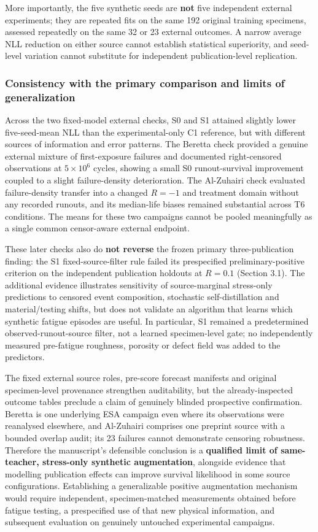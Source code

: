 \documentclass[12pt,a4paper]{article}
\begin{document}
More importantly, the five synthetic seeds are \textbf{not} five independent external experiments; they are repeated fits on the same 192 original training specimens, assessed repeatedly on the same 32 or 23 external outcomes. A narrow average NLL reduction on either source cannot establish statistical superiority, and seed-level variation cannot substitute for independent publication-level replication.

\subsubsection{Consistency with the primary comparison and limits of generalization}

Across the two fixed-model external checks, S0 and S1 attained slightly lower five-seed-mean NLL than the experimental-only C1 reference, but with different sources of information and error patterns. The Beretta check provided a genuine external mixture of first-exposure failures and documented right-censored observations at \(5\times10^6\) cycles, showing a small S0 runout-survival improvement coupled to a slight failure-density deterioration. The Al-Zuhairi check evaluated failure-density transfer into a changed \(R=-1\) and treatment domain without any recorded runouts, and its median-life biases remained substantial across T6 conditions. The means for these two campaigns cannot be pooled meaningfully as a single common censor-aware external endpoint.

These later checks also do \textbf{not reverse} the frozen primary three-publication finding: the S1 fixed-source-filter rule failed its prespecified preliminary-positive criterion on the independent publication holdouts at \(R=0.1\) (Section 3.1). The additional evidence illustrates sensitivity of source-marginal stress-only predictions to censored event composition, stochastic self-distillation and material/testing shifts, but does not validate an algorithm that learns which synthetic fatigue episodes are useful. In particular, S1 remained a predetermined observed-runout-source filter, not a learned specimen-level gate; no independently measured pre-fatigue roughness, porosity or defect field was added to the predictors.

The fixed external source roles, pre-score forecast manifests and original specimen-level provenance strengthen auditability, but the already-inspected outcome tables preclude a claim of genuinely blinded prospective confirmation. Beretta is one underlying ESA campaign even where its observations were reanalysed elsewhere, and Al-Zuhairi comprises one preprint source with a bounded overlap audit; its 23 failures cannot demonstrate censoring robustness. Therefore the manuscript's defensible conclusion is a \textbf{qualified limit of same-teacher, stress-only synthetic augmentation}, alongside evidence that modelling publication effects can improve survival likelihood in some source configurations. Establishing a generalizable positive augmentation mechanism would require independent, specimen-matched measurements obtained before fatigue testing, a prespecified use of that new physical information, and subsequent evaluation on genuinely untouched experimental campaigns.
\end{document}
